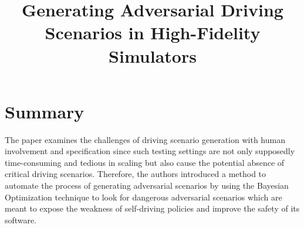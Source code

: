 \documentclass[10pt,a4paper]{report}
\title{Generating Adversarial Driving Scenarios in High-Fidelity Simulators}
\begin{document}
\begin{center}
\textbf{\thetitle}
\end{center}


\section{Summary}
The paper examines the challenges of driving scenario generation with human involvement and specification since such testing settings are not only supposedly time-consuming and tedious in scaling but also cause the potential absence of critical driving scenarios.
%
Therefore, the authors introduced a method to automate the process of generating adversarial scenarios by using the Bayesian Optimization technique to look for dangerous adversarial scenarios which are meant to expose the weakness of self-driving policies and improve the safety of its software.
%
\end{document}
